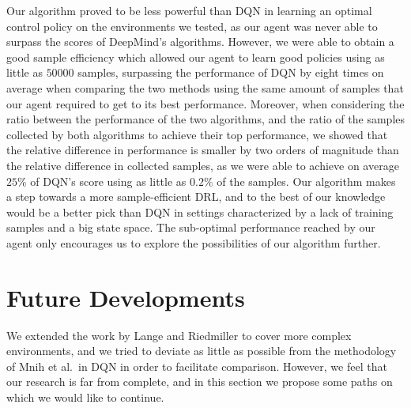 Our algorithm proved to be less powerful than DQN in learning an optimal control
policy on the environments we tested, as our agent was never able to surpass the
scores of DeepMind's algorithms.
However, we were able to obtain a good sample efficiency which allowed our agent 
to learn good policies using as little as $50000$ samples, surpassing the 
performance of DQN by eight times on average when comparing the two methods 
using the same amount of samples that our agent required to get to its best 
performance.
Moreover, when considering the ratio between the performance of the two 
algorithms, and the ratio of the samples collected by both algorithms to 
achieve their top performance, we showed that the relative difference in 
performance is smaller by two orders of magnitude than the relative difference 
in collected samples, as we were able to achieve on average $25\%$ of DQN's 
score using as little as $0.2\%$ of the samples. 
Our algorithm makes a step towards a more sample-efficient DRL, and to the
best of our knowledge would be a better pick than DQN in settings characterized 
by a lack of training samples and a big state space. The sub-optimal performance
reached by our agent only encourages us to explore the possibilities of our
algorithm further.

\section{Future Developments}
We extended the work by Lange and Riedmiller \cite{lange2010deep} to cover 
more complex environments, and we tried to deviate as little as possible from 
the methodology of Mnih et al.\ in DQN in order to facilitate comparison. 
However, we feel that our research is far from complete, and in this section we 
propose some paths on which we would like to continue. 

